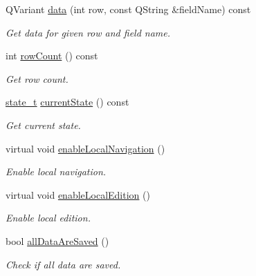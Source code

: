 \begin{DoxyCompactItemize}
Q\-Variant \hyperlink{classmdt_abstract_sql_widget_a3d362ebfc2d4f4b40b48ca08db287b3c}{data} (int row, const Q\-String \&field\-Name) const 
\begin{DoxyCompactList}\small\item\em Get data for given row and field name. \end{DoxyCompactList}\item 
int \hyperlink{classmdt_abstract_sql_widget_a5e25e4a2e0dc56c06c530c9b543366f2}{row\-Count} () const 
\begin{DoxyCompactList}\small\item\em Get row count. \end{DoxyCompactList}\item 
\hyperlink{classmdt_abstract_sql_widget_a54e6a7f2b41fb3edfa1e4ed62abf4072}{state\-\_\-t} \hyperlink{classmdt_abstract_sql_widget_a786eb7b7b111eef748002419984be7d9}{current\-State} () const 
\begin{DoxyCompactList}\small\item\em Get current state. \end{DoxyCompactList}\item 
virtual void \hyperlink{classmdt_abstract_sql_widget_a586e89097e9b4c27888695796ce945a0}{enable\-Local\-Navigation} ()
\begin{DoxyCompactList}\small\item\em Enable local navigation. \end{DoxyCompactList}\item 
virtual void \hyperlink{classmdt_abstract_sql_widget_a4ad94a530c77292d122d38eb041da6e9}{enable\-Local\-Edition} ()
\begin{DoxyCompactList}\small\item\em Enable local edition. \end{DoxyCompactList}\item 
bool \hyperlink{classmdt_abstract_sql_widget_aa5824c5fc3b0a7e118dd9ebb19084d2c}{all\-Data\-Are\-Saved} ()
\begin{DoxyCompactList}\small\item\em Check if all data are saved. \end{DoxyCompactList}\end{DoxyCompactItemize}
